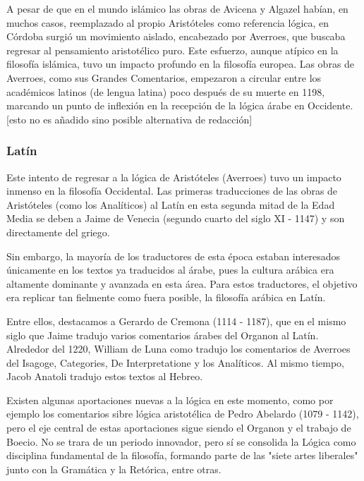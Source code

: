 \documentclass{article}
\begin{document}
A pesar de que en el mundo islámico las obras de Avicena y Algazel habían, en muchos casos, reemplazado al propio Aristóteles como referencia lógica, en Córdoba surgió un movimiento aislado, encabezado por Averroes, que buscaba regresar al pensamiento aristotélico puro. Este esfuerzo, aunque atípico en la filosofía islámica, tuvo un impacto profundo en la filosofía europea. Las obras de Averroes, como sus Grandes Comentarios, empezaron a circular entre los académicos latinos (de lengua latina) poco después de su muerte en 1198, marcando un punto de inflexión en la recepción de la lógica árabe en Occidente\cite{street2001arabic, charles2004latin}. [esto no es añadido sino posible alternativa de redacción]

\subsubsection{Latín}

Este intento de regresar a la lógica de Aristóteles (Averroes) tuvo un impacto inmenso en la filosofía Occidental. Las primeras traducciones de las obras de Aristóteles (como los Analíticos) al Latín en esta segunda mitad de la Edad Media se deben a Jaime de Venecia (segundo cuarto del siglo XI - 1147) y son directamente del griego.

Sin embargo, la mayoría de los traductores de esta época estaban interesados únicamente en los textos ya traducidos al árabe, pues la cultura arábica era altamente dominante y avanzada en esta área. Para estos traductores, el objetivo era replicar tan fielmente como fuera posible, la filosofía arábica en Latín.

Entre ellos, destacamos a Gerardo de Cremona (1114 - 1187), que en el mismo siglo que Jaime tradujo varios comentarios árabes del Organon al Latín. Alrededor del 1220, William de Luna como tradujo los comentarios de Averroes del Isagoge, Categories, De Interpretatione y los Analíticos. Al mismo tiempo, Jacob Anatoli tradujo estos textos al Hebreo\cite{charles2004latin}.

Existen algunas aportaciones nuevas a la lógica en este momento, como por ejemplo los comentarios sibre lógica aristotélica de Pedro Abelardo (1079 - 1142), pero el eje central de estas aportaciones sigue siendo el Organon y el trabajo de Boecio. No se trara de un periodo innovador, pero sí se consolida la Lógica como disciplina fundamental de la filosofía\cite{marebon2008logic}, formando parte de las "siete artes liberales" junto con la Gramática y la Retórica, entre otras.
\end{document}
